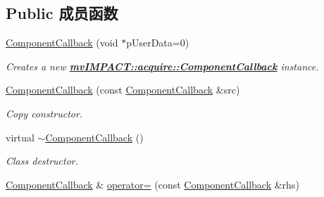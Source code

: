\subsection*{Public 成员函数}
\begin{DoxyCompactItemize}
\item 
\hyperlink{classmv_i_m_p_a_c_t_1_1acquire_1_1_component_callback_ac556b7ac1a6517f30734cbdae4f6ed6e}{Component\+Callback} (void $\ast$p\+User\+Data=0)
\begin{DoxyCompactList}\small\item\em Creates a new {\bfseries \hyperlink{classmv_i_m_p_a_c_t_1_1acquire_1_1_component_callback}{mv\+I\+M\+P\+A\+C\+T\+::acquire\+::\+Component\+Callback}} instance. \end{DoxyCompactList}\item 
\hyperlink{classmv_i_m_p_a_c_t_1_1acquire_1_1_component_callback_af5c336a5c4d3b33e34160a06bcf8ef11}{Component\+Callback} (const \hyperlink{classmv_i_m_p_a_c_t_1_1acquire_1_1_component_callback}{Component\+Callback} \&src)
\begin{DoxyCompactList}\small\item\em Copy constructor. \end{DoxyCompactList}\item 
virtual \hyperlink{classmv_i_m_p_a_c_t_1_1acquire_1_1_component_callback_a78709794813d94114c2855a5d32ffdb0}{$\sim$\+Component\+Callback} ()
\begin{DoxyCompactList}\small\item\em Class destructor. \end{DoxyCompactList}\item 
\hypertarget{classmv_i_m_p_a_c_t_1_1acquire_1_1_component_callback_a0d76e0477975779dea9d6a32d9e13bf8}{\hyperlink{classmv_i_m_p_a_c_t_1_1acquire_1_1_component_callback}{Component\+Callback} \& \hyperlink{classmv_i_m_p_a_c_t_1_1acquire_1_1_component_callback_a0d76e0477975779dea9d6a32d9e13bf8}{operator=} (const \hyperlink{classmv_i_m_p_a_c_t_1_1acquire_1_1_component_callback}{Component\+Callback} \&rhs)}\label{classmv_i_m_p_a_c_t_1_1acquire_1_1_component_callback_a0d76e0477975779dea9d6a32d9e13bf8}


\end{DoxyCompactItemize}
